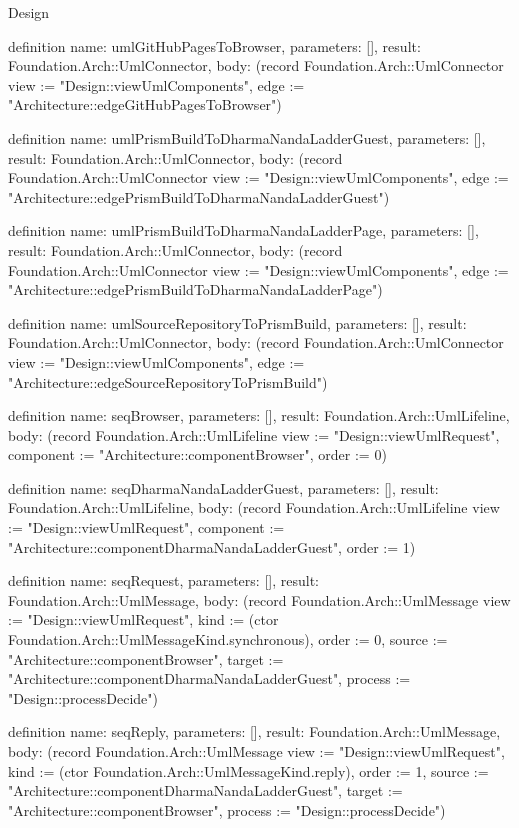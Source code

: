 \begin{lexlean}{Design}
\begin{semanticmodule}
definition{
  name: umlGitHubPagesToBrowser,
  parameters: [],
  result: Foundation.Arch::UmlConnector,
  body: (record Foundation.Arch::UmlConnector {view := "Design::viewUmlComponents", edge := "Architecture::edgeGitHubPagesToBrowser"})
}

definition{
  name: umlPrismBuildToDharmaNandaLadderGuest,
  parameters: [],
  result: Foundation.Arch::UmlConnector,
  body: (record Foundation.Arch::UmlConnector {view := "Design::viewUmlComponents", edge := "Architecture::edgePrismBuildToDharmaNandaLadderGuest"})
}

definition{
  name: umlPrismBuildToDharmaNandaLadderPage,
  parameters: [],
  result: Foundation.Arch::UmlConnector,
  body: (record Foundation.Arch::UmlConnector {view := "Design::viewUmlComponents", edge := "Architecture::edgePrismBuildToDharmaNandaLadderPage"})
}

definition{
  name: umlSourceRepositoryToPrismBuild,
  parameters: [],
  result: Foundation.Arch::UmlConnector,
  body: (record Foundation.Arch::UmlConnector {view := "Design::viewUmlComponents", edge := "Architecture::edgeSourceRepositoryToPrismBuild"})
}

definition{
  name: seqBrowser,
  parameters: [],
  result: Foundation.Arch::UmlLifeline,
  body: (record Foundation.Arch::UmlLifeline {view := "Design::viewUmlRequest", component := "Architecture::componentBrowser", order := 0})
}

definition{
  name: seqDharmaNandaLadderGuest,
  parameters: [],
  result: Foundation.Arch::UmlLifeline,
  body: (record Foundation.Arch::UmlLifeline {view := "Design::viewUmlRequest", component := "Architecture::componentDharmaNandaLadderGuest", order := 1})
}

definition{
  name: seqRequest,
  parameters: [],
  result: Foundation.Arch::UmlMessage,
  body: (record Foundation.Arch::UmlMessage {view := "Design::viewUmlRequest", kind := (ctor Foundation.Arch::UmlMessageKind.synchronous), order := 0, source := "Architecture::componentBrowser", target := "Architecture::componentDharmaNandaLadderGuest", process := "Design::processDecide"})
}

definition{
  name: seqReply,
  parameters: [],
  result: Foundation.Arch::UmlMessage,
  body: (record Foundation.Arch::UmlMessage {view := "Design::viewUmlRequest", kind := (ctor Foundation.Arch::UmlMessageKind.reply), order := 1, source := "Architecture::componentDharmaNandaLadderGuest", target := "Architecture::componentBrowser", process := "Design::processDecide"})
}


\end{semanticmodule}
\end{lexlean}
